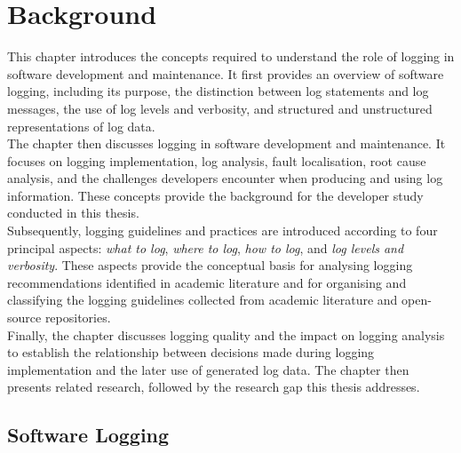 \chapter{Background}
\label{chap:background}

This chapter introduces the concepts required to understand the role of logging in software development and maintenance.
It first provides an overview of software logging, including its purpose, the distinction between log statements and log messages,
the use of log levels and verbosity, and structured and unstructured representations of log data.
\\
The chapter then discusses logging in software development and maintenance. 
It focuses on logging implementation, log analysis, fault localisation, root cause analysis, 
and the challenges developers encounter when producing and using log information. 
These concepts provide the background for the developer study conducted in this thesis.
\\
Subsequently, logging guidelines and practices are introduced according to four principal aspects: \textit{what to log},
\textit{where to log}, \textit{how to log}, and \textit{log levels and verbosity}. 
These aspects provide the conceptual basis for analysing logging recommendations identified in academic literature
and for organising and classifying the logging guidelines collected from academic literature 
and open-source repositories.
\\
Finally, the chapter discusses logging quality and the impact on logging analysis to establish the relationship 
between decisions made during logging implementation and the later use of generated log data. 
The chapter then presents related research, followed by the research gap this thesis addresses.


\section{Software Logging}
\label{sec:background_logging}

